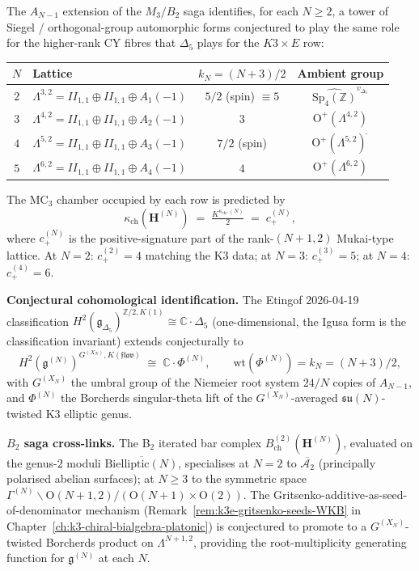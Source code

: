 \begin{remark}
\label{rem:m3b2-gaiotto-kn-family}
The $A_{N-1}$ extension of the $M_3/B_2$ saga identifies, for
each $N \geq 2$, a tower of Siegel / orthogonal-group automorphic
forms conjectured to play the same role for the higher-rank CY fibres
that $\Delta_5$ plays for the $K3\times E$ row:

\begin{center}
\begin{tabular}{c|lcc}
$N$ & Lattice & $k_N = (N{+}3)/2$ & Ambient group \\\hline
$2$ & $\Lambda^{3,2} = II_{1,1}\oplus II_{1,1}\oplus A_1(-1)$
    & $5/2$ (spin) $\equiv 5$ & $\widehat{\mathrm{Sp}_4(\mathbb Z)}^{v_{\Delta_5}}$ \\
$3$ & $\Lambda^{4,2} = II_{1,1}\oplus II_{1,1}\oplus A_2(-1)$
    & $3$                     & $\mathrm{O}^+(\Lambda^{4,2})$ \\
$4$ & $\Lambda^{5,2} = II_{1,1}\oplus II_{1,1}\oplus A_3(-1)$
    & $7/2$ (spin)            & $\mathrm{O}^+(\Lambda^{5,2})^{\widetilde{\ }}$ \\
$5$ & $\Lambda^{6,2} = II_{1,1}\oplus II_{1,1}\oplus A_4(-1)$
    & $4$                     & $\mathrm{O}^+(\Lambda^{6,2})$ \\
\end{tabular}
\end{center}

The MC$_3$ chamber occupied by each row is predicted by
\[
\kappa_{\mathrm{ch}}(\mathbf{H}^{(N)}) \;=\; \tfrac{K^{\kappa_{\mathrm{ch}},(N)}}{2}
\;=\; c_+^{(N)},
\]
where $c_+^{(N)}$ is the positive-signature part of the rank-$(N{+}1,2)$
Mukai-type lattice. At $N=2$: $c_+^{(2)} = 4$ matching the K3
data; at $N=3$: $c_+^{(3)} = 5$; at $N=4$: $c_+^{(4)} = 6$.

\textbf{Conjectural cohomological identification.} The
Etingof 2026-04-19 classification
$H^2(\mathfrak{g}_{\Delta_5})^{\mathbb Z/2, K(1)} \cong \mathbb C \cdot \Delta_5$
(one-dimensional, the Igusa form is the classification invariant)
extends conjecturally to
\[
H^2(\mathfrak{g}^{(N)})^{G^{(X_N)}, K(\mathfrak{flav})}
\;\cong\;
\mathbb C \cdot \Phi^{(N)},
\qquad
\mathrm{wt}(\Phi^{(N)}) = k_N = (N+3)/2,
\]
with $G^{(X_N)}$ the umbral group of the Niemeier root system $24/N$
copies of $A_{N-1}$, and $\Phi^{(N)}$ the Borcherds singular-theta lift
of the $G^{(X_N)}$-averaged $\mathfrak{su}(N)$-twisted K3 elliptic genus.

\textbf{$B_2$ saga cross-links.} The B$_2$ iterated bar complex
$B^{(2)}_{\mathrm{ch}}(\mathbf{H}^{(N)})$, evaluated on the genus-$2$
moduli $\overline{\mathrm{Bielliptic}(N)}$, specialises at
$N=2$ to $\overline{\mathcal{A}_2}$ (principally polarised abelian
surfaces); at $N\geq 3$ to the symmetric space
$\Gamma^{(N)} \backslash \mathrm{O}(N{+}1,2)/(\mathrm{O}(N{+}1)\times\mathrm{O}(2))$.
The Gritsenko-additive-as-seed-of-denominator mechanism
(Remark~\ref{rem:k3e-gritsenko-seeds-WKB} in
Chapter~\ref{ch:k3-chiral-bialgebra-platonic}) is conjectured to
promote to a $G^{(X_N)}$-twisted Borcherds product on $\Lambda^{N+1,2}$,
providing the root-multiplicity generating function for
$\mathfrak{g}^{(N)}$ at each $N$.


\end{remark}
